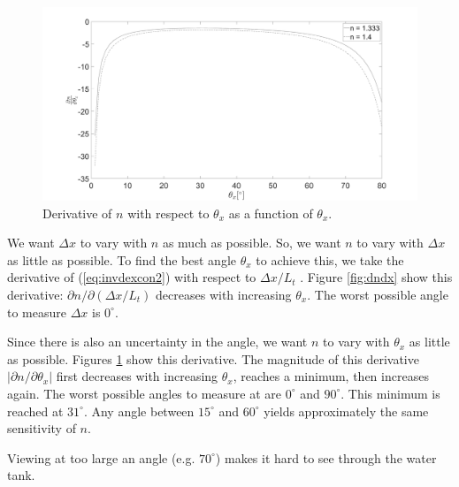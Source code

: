 \documentclass{article}
\begin{document}
\begin{figure}[hpbt]
	\includegraphics[width=\textwidth, keepaspectratio]{dndt.png}
	\caption{Derivative of $n$ with respect to $\theta_x$ as a function of $\theta_x$.}		
	\label{fig:dndt}
\end{figure}

We want $\Delta x$ to vary with $n$ as much as possible. So, we want $n$ to vary with $\Delta x$ as little as possible.  To find the best angle $\theta_x$ to achieve this, we take the derivative of (\ref{eq:invdexcon2}) with respect to $\Delta x/L_t$ \cite{nemoto1992measurement}. Figure \ref{fig:dndx} show this derivative: $\partial n/\partial (\Delta x/L_t)$ decreases with increasing $\theta_x$. The worst possible angle to measure $\Delta x$ is $0^\circ$.

Since there is also an uncertainty in the angle, we want $n$ to vary with $\theta_x$ as little as possible. Figures \ref{fig:dndt} show this derivative. The magnitude of this derivative $\left|\partial n/\partial \theta_x\right|$ first decreases with increasing $\theta_x$, reaches a minimum, then increases again. The worst possible angles to measure at are $0^\circ$ and $90^\circ$. This minimum is reached at $31^\circ$. Any angle between $15^\circ$ and $60^\circ$ yields approximately the same sensitivity of $n$. 

Viewing at too large an angle (e.g. $70^\circ$) makes it hard to see through the water tank. 
\end{document}
